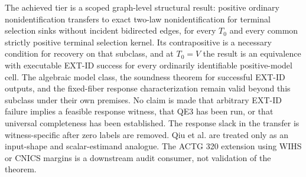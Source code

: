 \documentclass{article}
\begin{document}
The achieved tier is a scoped graph-level structural result: positive ordinary nonidentification transfers to exact two-law nonidentification for terminal selection sinks without incident bidirected edges, for every \(T_0\) and every common strictly positive terminal selection kernel. Its contrapositive is a necessary condition for recovery on that subclass, and at \(T_0=V\) the result is an equivalence with executable EXT-ID success for every ordinarily identifiable positive-model cell. The algebraic model class, the soundness theorem for successful EXT-ID outputs, and the fixed-fiber response characterization remain valid beyond this subclass under their own premises. No claim is made that arbitrary EXT-ID failure implies a feasible response witness, that QE3 has been run, or that universal completeness has been established. The response slack in the transfer is witness-specific after zero labels are removed. Qiu et al. are treated only as an input-shape and scalar-estimand analogue. The ACTG 320 extension using WIHS or CNICS margins is a downstream audit consumer, not validation of the theorem.
\end{document}
